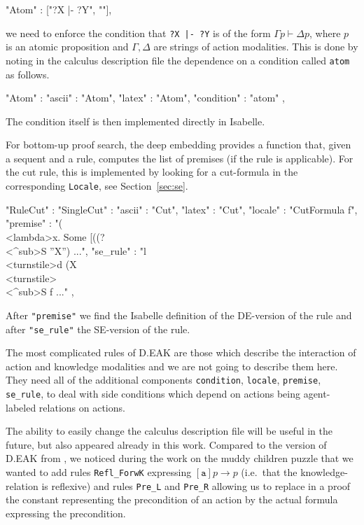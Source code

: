 \documentclass[runningheads,a4paper]{llncs}
\def\aga{\texttt{a}}
\begin{document}
\begin{pyglist}[language = json]
"Atom" : ["?X |- ?Y", ""],
\end{pyglist}
\noindent we need to enforce the condition that \texttt{?X |- ?Y} is of the form $\Gamma p \vdash \Delta p$, where $p$ is an atomic proposition and $\Gamma,\Delta$ are strings of action modalities. This is done by noting in the calculus description file the dependence on a condition called \texttt{atom} as follows.

\begin{pyglist}[language = json]
"Atom" : {
  "ascii" : "Atom",
  "latex" : "Atom",
  "condition" : "atom"			
},
\end{pyglist}
\noindent The condition itself is then implemented directly in Isabelle. 

For bottom-up proof search, the deep embedding provides a function that, given a sequent and a rule, computes the list of premises (if the rule is applicable). For the cut rule, this is implemented by looking for a cut-formula in the corresponding \texttt{Locale}, see Section~\ref{sec:se}.

\begin{pyglist}[language = json]
"RuleCut" : {
 "SingleCut" : {
  "ascii" : "Cut",
  "latex" : "Cut",
  "locale" : "CutFormula f",
  "premise" : "(\\<lambda>x. Some [((?\\<^sub>S ''X'') ...",
  "se_rule" : "l \\<turnstile>d (X \\<turnstile>\\<^sub>S f ..."
  }
 },
\end{pyglist}
\noindent After \texttt{"premise"} we find the Isabelle definition of the DE-version of the rule and after \texttt{"se\_rule"} the SE-version of the rule.

The most complicated rules of D.EAK are those  which describe the interaction of action and knowledge modalities and we are not going to describe them here. They need all of the additional components \texttt{condition}, \texttt{locale}, \texttt{premise}, 
\texttt{se\_rule}, to deal with side conditions which depend on actions being agent-labeled relations on actions.

The ability to easily change the calculus description file will be useful in the future, but also appeared already in this work. Compared to the version of D.EAK from \cite{DEAK}, we noticed during the work on the muddy children puzzle that we wanted to add rules \texttt{Refl\_ForwK} expressing $[\aga]p\to p$ (i.e.\ that the knowledge-relation is reflexive) and rules \texttt{Pre\_L} and \texttt{Pre\_R} allowing us to replace in a proof the constant representing the precondition of an action by the actual formula expressing the precondition.
\end{document}
